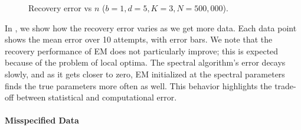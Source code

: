 \begin{figure}[tb]
  \centering
    \hspace{-2em}
  \caption{Recovery error vs $n$  ($b = 1, d = 5, K = 3, N = 500,000$).}
  \label{fig:vs-n}
\end{figure}

In , we show how the recovery error varies as we get
more data. Each data point shows the mean error over 10 attempts, with
error bars. We note that the recovery performance of EM does not
particularly improve; this is expected because of the problem of local
optima. The spectral algorithm's error decays slowly, and as it gets
closer to zero, EM initialized at the spectral parameters finds the true
parameters more often as well. This behavior highlights the trade-off
between statistical and computational error. 

\paragraph{Misspecified Data}

